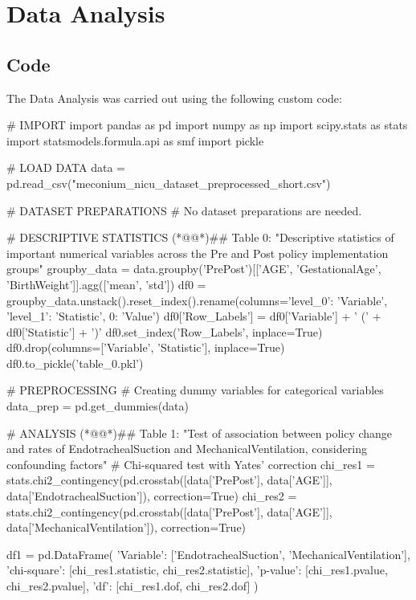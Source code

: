 \documentclass[11pt]{article}
\begin{document}
\section{Data Analysis}
\subsection{{Code}}
The Data Analysis was carried out using the following custom code:

\begin{python}

# IMPORT
import pandas as pd
import numpy as np
import scipy.stats as stats
import statsmodels.formula.api as smf
import pickle

# LOAD DATA
data = pd.read_csv("meconium_nicu_dataset_preprocessed_short.csv")

# DATASET PREPARATIONS
# No dataset preparations are needed.

# DESCRIPTIVE STATISTICS
(*@@*)## Table 0: "Descriptive statistics of important numerical variables across the Pre and Post policy implementation groups"
groupby_data = data.groupby('PrePost')[['AGE', 'GestationalAge', 'BirthWeight']].agg(['mean', 'std'])
df0 = groupby_data.unstack().reset_index().rename(columns={'level_0': 'Variable', 'level_1': 'Statistic', 0: 'Value'})
df0['Row_Labels'] = df0['Variable'] + ' (' + df0['Statistic'] + ')'
df0.set_index('Row_Labels', inplace=True)
df0.drop(columns=['Variable', 'Statistic'], inplace=True)
df0.to_pickle('table_0.pkl')

# PREPROCESSING 
# Creating dummy variables for categorical variables
data_prep = pd.get_dummies(data)

# ANALYSIS
(*@@*)## Table 1: "Test of association between policy change and rates of EndotrachealSuction and MechanicalVentilation, considering confounding factors"
# Chi-squared test with Yates' correction
chi_res1 = stats.chi2_contingency(pd.crosstab([data['PrePost'], data['AGE']], data['EndotrachealSuction']), correction=True)
chi_res2 = stats.chi2_contingency(pd.crosstab([data['PrePost'], data['AGE']], data['MechanicalVentilation']), correction=True)

df1 = pd.DataFrame({
    'Variable': ['EndotrachealSuction', 'MechanicalVentilation'],
    'chi-square': [chi_res1.statistic, chi_res2.statistic],
    'p-value': [chi_res1.pvalue, chi_res2.pvalue],
    'df': [chi_res1.dof, chi_res2.dof]
})


\end{python}
\end{document}
